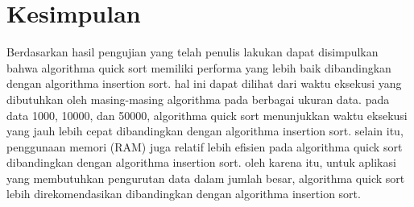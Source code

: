 \documentclass[12pt,a4paper,oneside]{report}
\begin{document}
    \section{Kesimpulan}
      Berdasarkan hasil pengujian yang telah penulis lakukan dapat disimpulkan bahwa algorithma quick sort memiliki performa yang lebih baik dibandingkan dengan algorithma insertion sort.
      hal ini dapat dilihat dari waktu eksekusi yang dibutuhkan oleh masing-masing algorithma pada berbagai ukuran data.
      pada data 1000, 10000, dan 50000, algorithma quick sort menunjukkan waktu eksekusi yang jauh lebih cepat dibandingkan dengan algorithma insertion sort.
      selain itu, penggunaan memori (RAM) juga relatif lebih efisien pada algorithma quick sort dibandingkan dengan algorithma insertion sort.
      oleh karena itu, untuk aplikasi yang membutuhkan pengurutan data dalam jumlah besar, algorithma quick sort lebih direkomendasikan dibandingkan dengan algorithma insertion sort.
\end{document}
